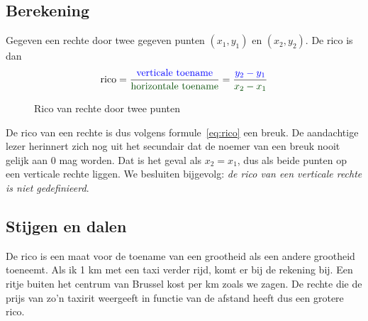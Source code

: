 \subsection{Berekening}
Gegeven een rechte door twee gegeven punten $(x_1, y_1)$ en $(x_2,y_2)$. De rico is dan
\begin{equation}\label{eq:rico}
\text{rico}=\dfrac{\text{\textcolor{blue}{verticale toename}}}{\text{\textcolor{donkergroen}{horizontale toename}}}=\dfrac{\textcolor{blue}{y_2-y_1}}{\textcolor{donkergroen}{x_2-x_1}}
\end{equation}
\begin{figure}[htbp]
    \centering
{}
\caption{Rico van rechte door twee punten}
    \label{fig:defrico}
\end{figure}
De rico van een rechte is dus volgens formule~\eqref{eq:rico} een breuk. De aandachtige lezer herinnert zich nog uit het secundair dat de noemer van een breuk nooit gelijk aan 0 mag worden. Dat is het geval als $x_2=x_1$, dus als beide punten op een verticale rechte liggen. We besluiten bijgevolg: \emph{de rico van een verticale rechte is niet gedefinieerd}.

\subsection{Stijgen en dalen}
De rico is een maat voor de toename van een grootheid als een andere grootheid toeneemt. Als ik 1 km met een taxi verder rijd, komt er  bij de rekening bij. Een ritje buiten het centrum van Brussel kost  per km zoals we zagen. De rechte die de prijs van zo'n taxirit weergeeft in functie van de afstand heeft dus een grotere rico. 


